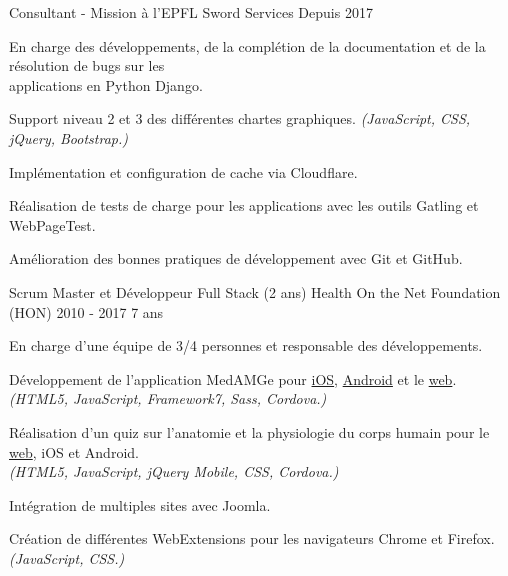 
\begin{cventries}

  \cventry
    {Consultant - Mission à l'EPFL}
    {Sword Services}
    {Depuis 2017}
    {}
    {
      \begin{cvitems}
        \item En charge des développements, de la complétion de la
          documentation et de la résolution de bugs sur les \\applications en
          Python Django.
        \item Support niveau 2 et 3 des différentes chartes graphiques.
          \textit{(JavaScript, CSS, jQuery, Bootstrap.)}
        \item Implémentation et configuration de cache via Cloudflare.
        \item Réalisation de tests de charge pour les applications avec
          les outils Gatling et WebPageTest.
        \item Amélioration des bonnes pratiques de développement avec Git et
          GitHub.
      \end{cvitems}
    }

  \cventry
    {Scrum Master et Développeur Full Stack (2 ans)}
    {Health On the Net Foundation (HON)}
    {2010 - 2017}
    {7 ans}
    {
      \begin{cvitems}
        \item En charge d'une équipe de 3/4 personnes et responsable des
          développements.
        \item Développement de l'application MedAMGe pour
          {\color{awesome-skyblue}
            \href{https://itunes.apple.com/us/app/medamge/id469762154?mt=8}{iOS}},
          {\color{awesome-skyblue}
            \href{https://play.google.com/store/apps/details?id=org.healthonnet.medamge.android&hl=en}{Android}}
          et le
          {\color{awesome-skyblue}
            \href{https://www.medamge.ch}{web}}.\\
            \textit{(HTML5, JavaScript, Framework7, Sass, Cordova.)}
        \item Réalisation d'un quiz sur l'anatomie et la physiologie du corps
          humain pour le
          {\color{awesome-skyblue}
            \href{https://www.santeromande.ch/Game/}{web}}, iOS et Android.\\
          \textit{(HTML5, JavaScript, jQuery Mobile, CSS, Cordova.)}
        \item Intégration de multiples sites avec Joomla.
        \item Création de différentes WebExtensions pour les navigateurs
          Chrome et Firefox. \textit{(JavaScript, CSS.)}
      \end{cvitems}
    }


\end{cventries}
